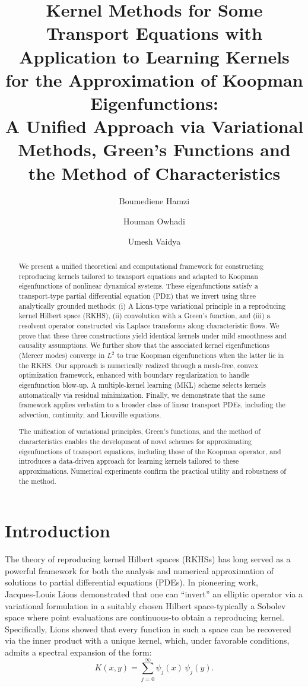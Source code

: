 \documentclass[11pt]{article}
\title{Kernel Methods for Some Transport Equations with Application to Learning Kernels for the Approximation of Koopman Eigenfunctions: \\ A Unified Approach via Variational Methods, Green’s Functions and the Method of Characteristics
}
\author[1,2]{Boumediene Hamzi}
\author[1]{Houman Owhadi}
\author[3]{Umesh Vaidya}
\affil[1]{Department of Computing and Mathematical Sciences, Caltech, Pasadena, CA, USA}
\affil[2]{The Alan Turing Institute, London, UK}
\affil[3]{Department of Mechanical Engineering, Clemson University, Clemson, SC, USA}
\date{}
\theoremstyle{plain}
\def\[{\begin{equation}}
\def\]{\end{equation}}
\begin{document}
\maketitle
 

\begin{abstract}
We present a unified theoretical and computational framework for constructing reproducing kernels tailored to transport equations and adapted to Koopman eigenfunctions of nonlinear dynamical systems. These eigenfunctions satisfy a transport-type partial differential equation (PDE) that we invert using three analytically grounded methods: (i) A Lions-type variational principle in a reproducing kernel Hilbert space (RKHS), (ii) convolution with a Green’s function,  and (iii) a resolvent operator constructed via Laplace transforms along characteristic flows. We prove that these three constructions yield identical kernels under mild smoothness and causality assumptions. We further show that the associated kernel eigenfunctions (Mercer modes) converge in \( L^2 \) to true Koopman eigenfunctions when the latter lie in the RKHS. Our approach is numerically realized through a mesh-free, convex optimization framework, enhanced with boundary regularization to handle eigenfunction blow-up. A multiple-kernel learning (MKL) scheme selects kernels automatically via residual minimization. Finally, we demonstrate that the same framework applies verbatim to a broader class of linear transport PDEs, including the advection, continuity, and Liouville equations.

The unification of variational principles, Green’s functions, and the method of characteristics enables the development of novel schemes for approximating eigenfunctions of transport equations, including those of the Koopman operator, and introduces a data-driven approach for learning kernels tailored to these approximations. Numerical experiments confirm the practical utility and robustness of the method.
\end{abstract}


\tableofcontents


\section{Introduction}

The theory of reproducing kernel Hilbert spaces (RKHSs) has long served as a powerful framework for both the analysis and numerical approximation of solutions to partial differential equations (PDEs). In pioneering work, Jacques‑Louis Lions \cite{lions1986noyau, lions1988remarks} demonstrated that one can “invert” an elliptic operator via a variational formulation in a suitably chosen Hilbert space-typically a Sobolev space where point evaluations are continuous-to obtain a reproducing kernel. Specifically, Lions showed that every function in such a space can be recovered via the inner product with a unique kernel, which, under favorable conditions, admits a spectral expansion of the form:
\[
K(x,y)= \sum_{j=0}^\infty \psi_j(x)\,\psi_j(y).
\]
\end{document}
